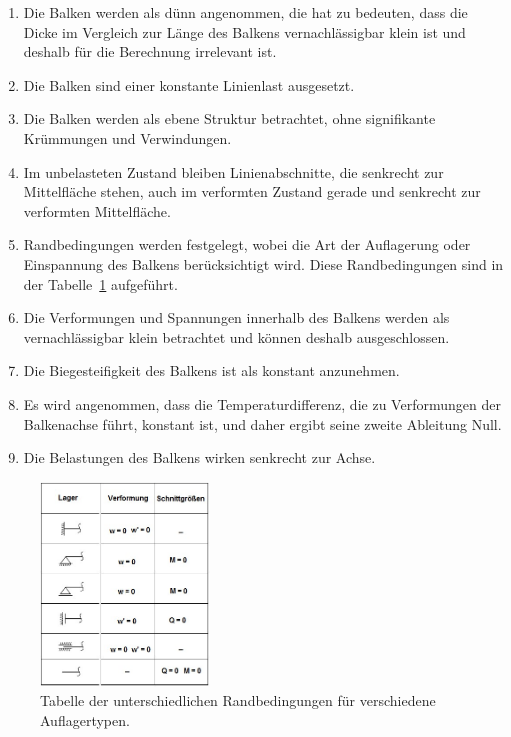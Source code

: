 \begin{enumerate}
	\item Die Balken werden als dünn angenommen, die hat zu bedeuten, dass die Dicke im Vergleich zur Länge des Balkens vernachlässigbar klein ist und deshalb für die Berechnung irrelevant ist.
	
	\item Die Balken sind einer konstante Linienlast ausgesetzt.
	
	\item Die Balken werden als ebene Struktur betrachtet, ohne signifikante Krümmungen und Verwindungen.
	
	\item Im unbelasteten Zustand bleiben Linienabschnitte, die senkrecht zur Mittelfläche stehen, auch im verformten Zustand gerade und senkrecht zur verformten Mittelfläche.
	
	\item Randbedingungen werden festgelegt, wobei die Art der Auflagerung oder Einspannung des Balkens berücksichtigt wird.
	Diese Randbedingungen sind in der Tabelle~\ref{balken:tabelle:rb} aufgeführt.
	
	\item Die Verformungen und Spannungen innerhalb des Balkens werden als vernachlässigbar klein betrachtet und können deshalb ausgeschlossen.
	
	\item Die Biegesteifigkeit des Balkens ist als konstant anzunehmen.
	
	\item Es wird angenommen, dass die Temperaturdifferenz, die zu Verformungen der Balkenachse führt, konstant ist, und daher ergibt seine zweite Ableitung Null.
	
	\item Die Belastungen des Balkens wirken senkrecht zur Achse.
\end{enumerate}
\begin{figure}
\begin{center}
	\includegraphics[width=0.4\textwidth]{papers/balken/images/teil2/Randbedingungen.jpg}
\end{center}
\caption{Tabelle der unterschiedlichen Randbedingungen für verschiedene Auflagertypen.
\label{balken:tabelle:rb}}
\end{figure}
